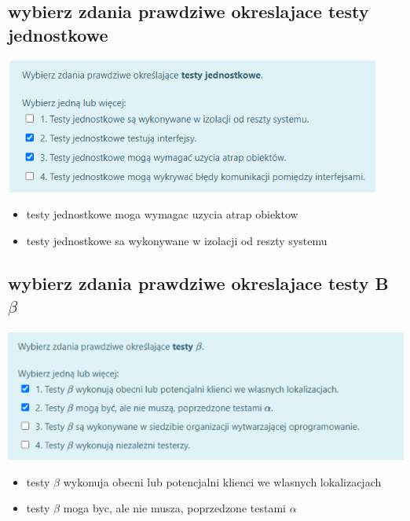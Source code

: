 \documentclass[11pt]{article}
\begin{document}
\subsection{wybierz zdania prawdziwe okreslajace testy jednostkowe}
\label{sec:orgeb2995b}
\begin{center}
\includegraphics[width=.9\linewidth]{./zadanie4.png}
\end{center}
\begin{itemize}
\item testy jednostkowe moga wymagac uzycia atrap obiektow
\item testy jednostkowe sa wykonywane w izolacji od reszty systemu
\end{itemize}
\subsection{wybierz zdania prawdziwe okreslajace testy B  \(\beta\)}
\label{sec:org31de086}
\begin{center}
\includegraphics[width=.9\linewidth]{./zadanie5.png}
\end{center}
\begin{itemize}
\item testy \(\beta\) wykonuja obecni lub potencjalni klienci we wlasnych lokalizacjach
\item testy \(\beta\) moga byc, ale nie musza, poprzedzone testami \(\alpha\)
\end{itemize}
\end{document}
